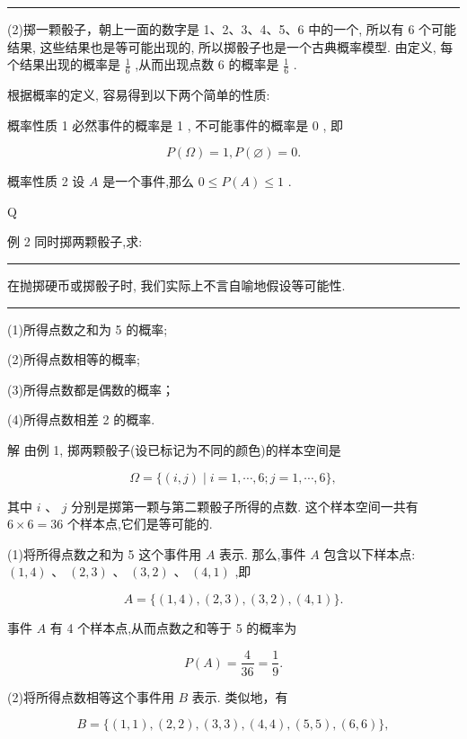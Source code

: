 \documentclass[10pt]{article}
\newcommand{\HRule}{\begin{center}\rule{0.9\linewidth}{0.2mm}\end{center}}
\begin{document}
\HRule

(2)掷一颗骰子，朝上一面的数字是 1、2、3、4、5、6 中的一个, 所以有 6 个可能结果, 这些结果也是等可能出现的, 所以掷骰子也是一个古典概率模型. 由定义, 每个结果出现的概率是 \(\frac{1}{6}\) ,从而出现点数 6 的概率是 \(\frac{1}{6}\) .

根据概率的定义, 容易得到以下两个简单的性质:

概率性质 1 必然事件的概率是 1 , 不可能事件的概率是 0 , 即

\[
P\left( \Omega \right)  = 1,P\left( \varnothing \right)  = 0.
\]

概率性质 2 设 \(A\) 是一个事件,那么 \(0 \leq  P\left( A\right)  \leq  1\) .

Q

例 2 同时掷两颗骰子,求:

\HRule

在抛掷硬币或掷骰子时, 我们实际上不言自喻地假设等可能性.

\HRule

(1)所得点数之和为 5 的概率;

(2)所得点数相等的概率;

(3)所得点数都是偶数的概率；

(4)所得点数相差 2 的概率.

解 由例 1, 掷两颗骰子(设已标记为不同的颜色)的样本空间是

\[
\Omega  = \{ \left( {i,j}\right)  \mid  i = 1,\cdots ,6;j = 1,\cdots ,6\} ,
\]

其中 \(i\text{ 、 }j\) 分别是掷第一颗与第二颗骰子所得的点数. 这个样本空间一共有 \(6 \times  6 = {36}\) 个样本点,它们是等可能的.

(1)将所得点数之和为 5 这个事件用 \(A\) 表示. 那么,事件 \(A\) 包含以下样本点: \(\left( {1,4}\right) \text{ 、 }\left( {2,3}\right) \text{ 、 }\left( {3,2}\right) \text{ 、 }\left( {4,1}\right)\) ,即

\[
A = \{ \left( {1,4}\right) ,\left( {2,3}\right) ,\left( {3,2}\right) ,\left( {4,1}\right) \} .
\]





事件 \(A\) 有 4 个样本点,从而点数之和等于 5 的概率为

\[
P\left( A\right)  = \frac{4}{36} = \frac{1}{9}.
\]

(2)将所得点数相等这个事件用 \(B\) 表示. 类似地，有

\[
B = \{ \left( {1,1}\right) ,\left( {2,2}\right) ,\left( {3,3}\right) ,\left( {4,4}\right) ,\left( {5,5}\right) ,\left( {6,6}\right) \} ,
\]
\end{document}
